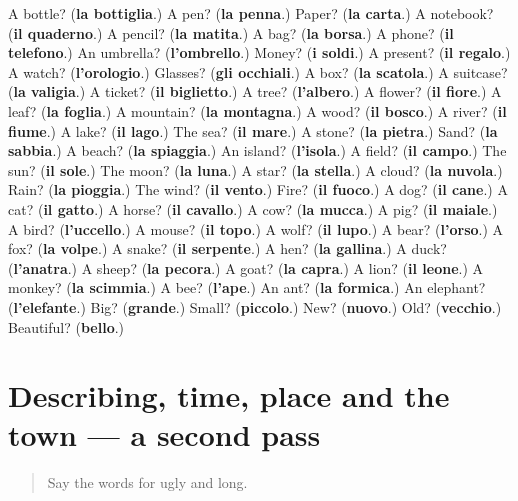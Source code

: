 \begin{tcolorbox}[breakable,colback=teal!4,colframe=teal!35!black,title={Before you move on}]
A bottle? (\textbf{la bottiglia}.) A pen? (\textbf{la penna}.) Paper? (\textbf{la carta}.) A notebook? (\textbf{il quaderno}.) A pencil? (\textbf{la matita}.) A bag? (\textbf{la borsa}.) A phone? (\textbf{il telefono}.) An umbrella? (\textbf{l'ombrello}.) Money? (\textbf{i soldi}.) A present? (\textbf{il regalo}.) A watch? (\textbf{l'orologio}.) Glasses? (\textbf{gli occhiali}.) A box? (\textbf{la scatola}.) A suitcase? (\textbf{la valigia}.) A ticket? (\textbf{il biglietto}.) A tree? (\textbf{l'albero}.) A flower? (\textbf{il fiore}.) A leaf? (\textbf{la foglia}.) A mountain? (\textbf{la montagna}.) A wood? (\textbf{il bosco}.) A river? (\textbf{il fiume}.) A lake? (\textbf{il lago}.) The sea? (\textbf{il mare}.) A stone? (\textbf{la pietra}.) Sand? (\textbf{la sabbia}.) A beach? (\textbf{la spiaggia}.) An island? (\textbf{l'isola}.) A field? (\textbf{il campo}.) The sun? (\textbf{il sole}.) The moon? (\textbf{la luna}.) A star? (\textbf{la stella}.) A cloud? (\textbf{la nuvola}.) Rain? (\textbf{la pioggia}.) The wind? (\textbf{il vento}.) Fire? (\textbf{il fuoco}.) A dog? (\textbf{il cane}.) A cat? (\textbf{il gatto}.) A horse? (\textbf{il cavallo}.) A cow? (\textbf{la mucca}.) A pig? (\textbf{il maiale}.) A bird? (\textbf{l'uccello}.) A mouse? (\textbf{il topo}.) A wolf? (\textbf{il lupo}.) A bear? (\textbf{l'orso}.) A fox? (\textbf{la volpe}.) A snake? (\textbf{il serpente}.) A hen? (\textbf{la gallina}.) A duck? (\textbf{l'anatra}.) A sheep? (\textbf{la pecora}.) A goat? (\textbf{la capra}.) A lion? (\textbf{il leone}.) A monkey? (\textbf{la scimmia}.) A bee? (\textbf{l'ape}.) An ant? (\textbf{la formica}.) An elephant? (\textbf{l'elefante}.) Big? (\textbf{grande}.) Small? (\textbf{piccolo}.) New? (\textbf{nuovo}.) Old? (\textbf{vecchio}.) Beautiful? (\textbf{bello}.)
\end{tcolorbox}
\section[(dialogue)]{Describing, time, place and the town — a second pass}

\label{lesson:IT-R84-second-pass-describing-time-place-and-the-town}



\begin{quote}
Say the words for ugly and long.
\end{quote}

